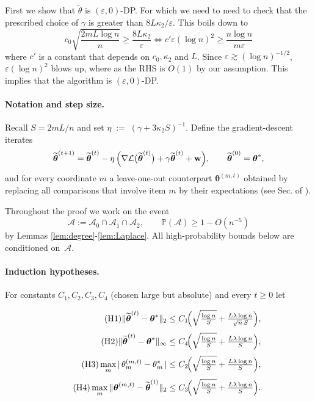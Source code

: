 \documentclass[letterpaper,12pt]{article}
\numberwithin{equation}{section}
\theoremstyle{plain}
\numberwithin{Theorem}{section}
\numberwithin{corollary}{section}
\numberwithin{proposition}{section}
\numberwithin{Lemma}{section}
{
	\theoremstyle{definition}
	\newtheorem{Definition}{Definition}
	\newtheorem{example}{Example}
	\numberwithin{example}{section}
	\newtheorem{fact}{Fact}
	\numberwithin{fact}{section}
	\newtheorem{remark}{Remark}
}
\newcommand{\Pro}{\mathbb{P}}
\newcommand{\1}{\mathbbm{1}}
\def\bth{{\boldsymbol{\theta}}}
\begin{document}
First we show that $\widetilde \theta$ is $(\varepsilon,0)$-DP. For which we need to need to check that the prescribed choice of $\gamma$ is greater than $8L\kappa_2/\varepsilon$. This boils down to
$$
c_0 \sqrt{\frac{2mL\log n}{n}} \geq \frac{8L\kappa_2}{\varepsilon} \iff c' \varepsilon (\log n)^2 \geq \frac{n \log n}{m\varepsilon}
$$
where $c'$ is a constant that depends on $c_0,\kappa_2$ and $L$. Since $\varepsilon \gtrsim (\log n)^{-1/2}$, $\varepsilon (\log n)^2$ blows up, where as the RHS is $O(1)$ by our assumption. This implies that the algorithm is $(\varepsilon,0)$-DP.
\paragraph{Notation and step size.}
Recall $S=2mL/n$ and set
\(
\eta\;:=\;(\gamma+3\kappa_{2}S)^{-1}.
\)
Define the gradient-descent iterates
\[
\widetilde\bth^{(t+1)}
=\widetilde\bth^{(t)}
-\eta\,
\Bigl(
\nabla\mathcal L\bigl(\widetilde\bth^{(t)}\bigr)
+\gamma\widetilde\bth^{(t)}
+\mathbf w
\Bigr),
\qquad
\widetilde\bth^{(0)}=\bth^{*},
\]
and for every coordinate $m$ a leave-one-out counterpart
\(\bth^{(m,t)}\) obtained by replacing all comparisons that involve item
$m$ by their expectations (see Sec. of
\cite{chen2019spectral}).

Throughout the proof we work on the event
\[
\mathcal A:=\mathcal A_{0}\cap\mathcal A_{1}
\cap\mathcal A_{2},
\qquad
\Pro(\mathcal A)\ge 1-O(n^{-5})
\]
by Lemmas \ref{lem:degree}-\ref{lem:Laplace}.                                         
All high-probability bounds below are conditioned on~\(\mathcal A\).

\paragraph{Induction hypotheses.}
For constants $C_{1},C_{2},C_{3},C_{4}$ (chosen large but absolute)
and every $t\ge0$ let

\begin{align}
	\tag{H1}
	\|\widetilde\bth^{(t)}-\bth^{*}\|_{2}
	&\le C_{1}\!\Bigl(
	\sqrt{\tfrac{\log n}{S}}
	+\tfrac{L\lambda\log n}{\sqrt n\,S}
	\Bigr),\\[3pt]
	\tag{H2}
	\|\widetilde\bth^{(t)}-\bth^{*}\|_{\infty}
	&\le C_{4}\!\Bigl(
	\sqrt{\tfrac{\log n}{S}}
	+\tfrac{L\lambda\log n}{S}
	\Bigr),\\[3pt]
	\tag{H3}
	\max_{m}|\,\theta^{(m,t)}_{m}-\theta^{*}_{m}\,|
	&\le C_{2}\!\Bigl(
	\sqrt{\tfrac{\log n}{S}}
	+\tfrac{L\lambda\log n}{S}
	\Bigr),\\[3pt]
	\tag{H4}
	\max_{m}\|\bth^{(m,t)}-\widetilde\bth^{(t)}\|_{2}
	&\le C_{3}\!\Bigl(
	\sqrt{\tfrac{\log n}{S}}
	+\tfrac{L\lambda\log n}{S}
	\Bigr).
\end{align}
\end{document}
